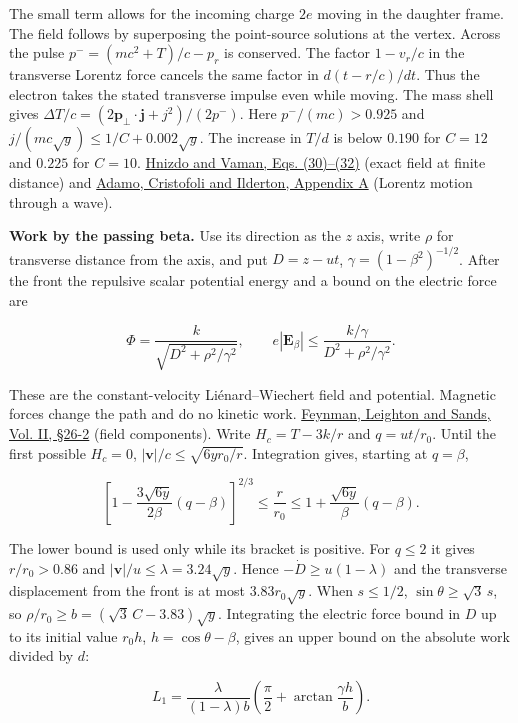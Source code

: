 \documentclass[11pt,a4paper]{article}
\begin{document}
The small term allows for the incoming charge \(2e\) moving in the
daughter frame. The field follows by superposing the point-source
solutions at the vertex. Across the pulse \(p^-=(mc^2+T)/c-p_r\) is
conserved. The factor \(1-v_r/c\) in the transverse Lorentz force
cancels the same factor in \(d(t-r/c)/dt\). Thus the electron takes the
stated transverse impulse even while moving. The mass shell gives
\(\Delta T/c=(2\boldsymbol p_\perp\cdot\boldsymbol j+j^2)/(2p^-)\). Here
\(p^-/(mc)>0.925\) and \(j/(mc\sqrt y)\le1/C+0.002\sqrt y\). The
increase in \(T/d\) is below \(0.190\) for \(C=12\) and \(0.225\) for
\(C=10\). \href{https://arxiv.org/pdf/2311.17652}{Hnizdo and Vaman, Eqs.
(30)--(32)} (exact field at finite distance) and
\href{https://doi.org/10.1007/JHEP08\%282022\%29281}{Adamo, Cristofoli
and Ilderton, Appendix A} (Lorentz motion through a wave).

\textbf{Work by the passing beta.} Use its direction as the \(z\) axis,
write \(\rho\) for transverse distance from the axis, and put
\(D=z-ut\), \(\gamma=(1-\beta^2)^{-1/2}\). After the front the repulsive
scalar potential energy and a bound on the electric force are

\[
 \Phi=\frac{k}{\sqrt{D^2+\rho^2/\gamma^2}},\qquad
 e|\boldsymbol E_\beta|
 \le\frac{k/\gamma}{D^2+\rho^2/\gamma^2}.
\]

These are the constant-velocity Liénard--Wiechert field and potential.
Magnetic forces change the path and do no kinetic work.
\href{https://www.feynmanlectures.caltech.edu/II_26.html\#Ch26-S2}{Feynman,
Leighton and Sands, Vol. II, §26-2} (field components). Write
\(H_c=T-3k/r\) and \(q=ut/r_0\). Until the first possible \(H_c=0\),
\(|\boldsymbol v|/c\le\sqrt{6yr_0/r}\). Integration gives, starting at
\(q=\beta\),

\[
 \left[1-\frac{3\sqrt{6y}}{2\beta}(q-\beta)\right]^{2/3}
 \le \frac r{r_0}\le 1+\frac{\sqrt{6y}}{\beta}(q-\beta).
\]

The lower bound is used only while its bracket is positive. For
\(q\le2\) it gives \(r/r_0>0.86\) and \(|\boldsymbol v|/u\le
\lambda=3.24\sqrt y\). Hence \(-\dot D\ge u(1-\lambda)\) and the
transverse displacement from the front is at most \(3.83r_0\sqrt y\).
When \(s\le1/2\), \(\sin\theta\ge\sqrt3\,s\), so
\(\rho/r_0\ge b=(\sqrt3\,C-3.83)\sqrt y\). Integrating the electric
force bound in \(D\) up to its initial value \(r_0 h\),
\(h=\cos\theta-\beta\), gives an upper bound on the absolute work
divided by \(d\):

\[
 L_1=\frac{\lambda}{(1-\lambda)b}
      \left(\frac{\pi}{2}+\arctan\frac{\gamma h}{b}\right).
\]
\end{document}
